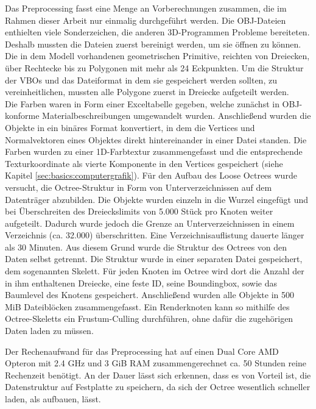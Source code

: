 Das Preprocessing fasst eine Menge an Vorberechnungen zusammen, die im Rahmen dieser Arbeit nur einmalig durchgeführt werden. Die OBJ-Dateien enthielten viele Sonderzeichen, die anderen 3D-Programmen Probleme bereiteten. Deshalb mussten die Dateien zuerst bereinigt werden, um sie öffnen zu können. Die in dem Modell vorhandenen geometrischen Primitive, reichten von Dreiecken, über Rechtecke bis zu Polygonen mit mehr als 24 Eckpunkten. Um die Struktur der VBOs und das Dateiformat in dem sie gespeichert werden sollten, zu vereinheitlichen, mussten alle Polygone zuerst in Dreiecke aufgeteilt werden. \\
Die Farben waren in Form einer Exceltabelle gegeben, welche zunächst in OBJ-konforme Materialbeschreibungen umgewandelt wurden. Anschließend wurden die Objekte in ein binäres Format konvertiert, in dem die Vertices und Normalvektoren eines Objektes direkt hintereinander in einer Datei standen. Die Farben wurden zu einer 1D-Farbtextur zusammengefasst und die entsprechende Texturkoordinate als vierte Komponente in den Vertices gespeichert (siehe Kapitel \ref{sec:basics:computergrafik}). Für den Aufbau des Loose Octrees wurde versucht, die Octree-Struktur in Form von Unterverzeichnissen auf dem Datenträger abzubilden. Die Objekte wurden einzeln in die Wurzel eingefügt und bei Überschreiten des Dreieckslimits von 5.000 Stück pro Knoten weiter aufgeteilt. Dadurch wurde jedoch die Grenze an Unterverzeichnissen in einem Verzeichnis (ca. 32.000) überschritten. Eine Verzeichnisauflistung dauerte länger als 30 Minuten. Aus diesem Grund wurde die Struktur des Octrees von den Daten selbst getrennt. Die Struktur wurde in einer separaten Datei gespeichert, dem sogenannten Skelett. Für jeden Knoten im Octree wird dort die Anzahl der in ihm enthaltenen Dreiecke, eine feste ID, seine Boundingbox, sowie das Baumlevel des Knotens gespeichert. Anschließend wurden alle Objekte in 500 MiB Dateiblöcken zusammengefasst. Ein Renderknoten kann so mithilfe des Octree-Skeletts ein Frustum-Culling durchführen, ohne dafür die zugehörigen Daten laden zu müssen.

Der Rechenaufwand für das Preprocessing hat auf einen Dual Core AMD Opteron mit 2.4 GHz und 3 GiB RAM zusammengerechnet ca. 50 Stunden reine Rechenzeit benötigt. An der Dauer lässt sich erkennen, dass es von Vorteil ist, die Datenstruktur auf Festplatte zu speichern, da sich der Octree wesentlich schneller laden, als aufbauen, lässt.

